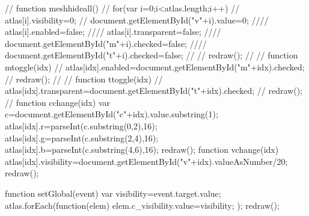 //            function meshhideall(){
//                for(var i=0;i<atlas.length;i++){
//                    atlas[i].visibility=0;
//                    document.getElementById("v"+i).value=0;
////                    atlas[i].enabled=false;
////                    atlas[i].transparent=false;
////                    document.getElementById("m"+i).checked=false;
////                    document.getElementById("t"+i).checked=false;
//                }
//                redraw();
//            }
//            function mtoggle(idx){
//                atlas[idx].enabled=document.getElementById("m"+idx).checked;
//                redraw();
//            }
//            function ttoggle(idx){
//                atlas[idx].transparent=document.getElementById("t"+idx).checked;
//                redraw();
//            }
            function cchange(idx){
                var c=document.getElementById("c"+idx).value.substring(1);
                atlas[idx].r=parseInt(c.substring(0,2),16);
                atlas[idx].g=parseInt(c.substring(2,4),16);
                atlas[idx].b=parseInt(c.substring(4,6),16);
                redraw();
            }
            function vchange(idx){
                atlas[idx].visibility=document.getElementById("v"+idx).valueAsNumber/20;
                redraw();
            }
            
            function setGlobal(event){
                var visibility=event.target.value;
                atlas.forEach(function(elem){
                    elem.c_visibility.value=visibility;
                });
                redraw();
            }
            

